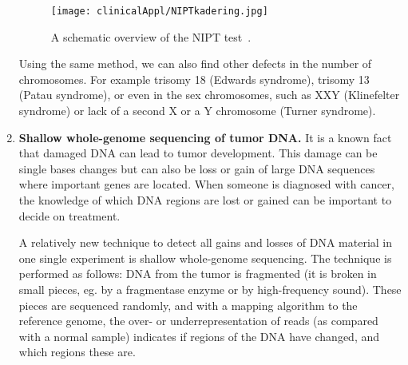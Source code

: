 \begin{enumerate}
	\begin{figure}[H]
		\centering
		\texttt{[image: clinicalAppl/NIPTkadering.jpg]}
		\caption{A schematic overview of the NIPT test~\cite{NIPT}.}
		\label{fig:NIPT}
	\end{figure}
	
	Using the same method, we can also find other defects in the number of chromosomes. For example trisomy 18 (Edwards syndrome), trisomy 13 (Patau syndrome), or even in the sex chromosomes, such as XXY (Klinefelter syndrome) or lack of a second X or a Y chromosome (Turner syndrome).
	
	\item \textbf{Shallow whole-genome sequencing of tumor DNA.}\newline
	It is a known fact that damaged DNA can lead to tumor development. This damage can be single bases changes but can also be loss or gain of large DNA sequences where important genes are located. When someone is diagnosed with cancer, the knowledge of which DNA regions are lost or gained can be important to decide on treatment. 
	
	A relatively new technique to detect all gains and losses of DNA material in one single experiment is shallow whole-genome sequencing. The technique is performed as follows: DNA from the tumor is fragmented (it is broken in small pieces, eg. by a fragmentase enzyme or by high-frequency sound). These pieces are sequenced randomly, and with a mapping algorithm to the reference genome, the over- or underrepresentation of reads (as compared with a normal sample) indicates if regions of the DNA have changed, and which regions these are.
\end{enumerate}